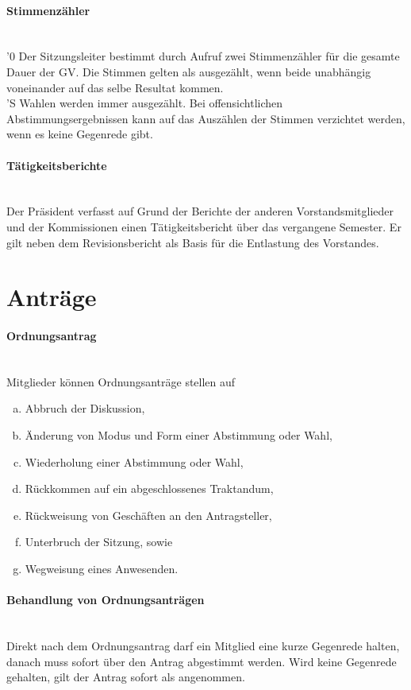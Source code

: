 \documentclass[a4paper,11pt]{article}
\newcommand{\nl}{\\[1.5ex]}
\begin{document}
\paragraph{Stimmenzähler} \ \\
'0 Der Sitzungsleiter bestimmt durch Aufruf zwei Stimmenzähler für die gesamte Dauer der GV. Die Stimmen gelten als ausgezählt, wenn beide unabhängig voneinander auf das selbe Resultat kommen. \nl
'S Wahlen werden immer ausgezählt. Bei offensichtlichen Abstimmungsergebnissen kann auf das Auszählen der Stimmen verzichtet werden, wenn es keine Gegenrede gibt.


\paragraph{Tätigkeitsberichte} \ \\
Der Präsident verfasst auf Grund der Berichte der anderen Vorstandsmitglieder und der Kommissionen einen Tätigkeitsbericht über das vergangene Semester. Er gilt neben dem Revisionsbericht als Basis für die Entlastung des Vorstandes.


\section*{Anträge}
\paragraph{Ordnungsantrag} \ \\
Mitglieder können Ordnungsanträge stellen auf
\begin{enumerate}[(a)]
  \item Abbruch der Diskussion,
  \item Änderung von Modus und Form einer Abstimmung oder Wahl,
  \item Wiederholung einer Abstimmung oder Wahl,
  \item Rückkommen auf ein abgeschlossenes Traktandum,
  \item Rückweisung von Geschäften an den Antragsteller,
  \item Unterbruch der Sitzung, sowie
  \item Wegweisung eines Anwesenden.
\end{enumerate}


\paragraph{Behandlung von Ordnungsanträgen} \ \\
Direkt nach dem Ordnungsantrag darf ein Mitglied eine kurze Gegenrede halten, danach muss sofort über den Antrag abgestimmt werden. Wird keine Gegenrede gehalten, gilt der Antrag sofort als angenommen.
\end{document}
